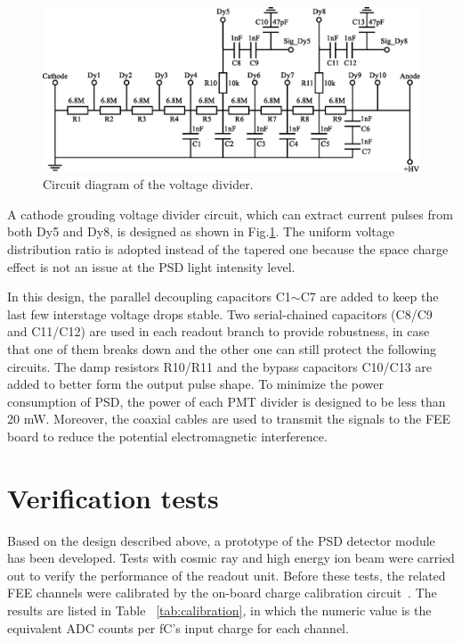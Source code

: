 \documentclass[preprint, times]{elsarticle}
\begin{document}
\begin{figure}
\centering
 \includegraphics[width=130mm]{divider}
\caption{Circuit diagram of the voltage divider.}
\label{fig:divider}
\end{figure}

A cathode grouding voltage divider circuit, which can extract current pulses from both Dy5 and Dy8, is designed as shown in Fig.\ref{fig:divider}.
The uniform voltage distribution ratio is adopted instead of the tapered one because the space charge effect is not an issue at the PSD light intensity level.

In this design, the parallel decoupling capacitors C1$\sim$C7 are added to keep the last few interstage voltage drops stable. Two serial-chained capacitors (C8/C9 and C11/C12) are used in each readout branch to provide robustness, in case that one of them breaks down and the other one can still protect the following circuits. 
The damp resistors R10/R11 and the bypass capacitors C10/C13 are added to better form the output pulse shape. 
To minimize the power consumption of PSD, the power of each PMT divider is designed to be less than 20 mW. 
Moreover, the coaxial cables are used to transmit the signals to the FEE board to reduce the potential electromagnetic interference.


\section{Verification tests}
\label{sec:result}
Based on the design described above, a prototype of the PSD detector module has been developed.
Tests with cosmic ray and high energy ion beam were carried out to verify the performance of the readout unit.
Before these tests, the related FEE channels were calibrated by the on-board charge calibration circuit~\cite{fee}.
The results are listed in Table ~\ref{tab:calibration}, in which the numeric value is the equivalent ADC counts per \si{\femto\coulomb}'s input charge for each channel.
\end{document}
